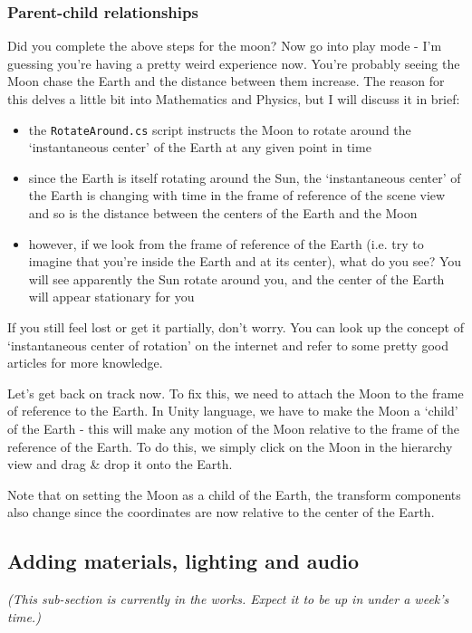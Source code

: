\documentclass{article}[a4paper,12pt]
\theoremstyle{definition}
\begin{document}
\subsubsection{Parent-child relationships}
Did you complete the above steps for the moon? Now go into play mode - I'm guessing you're having a pretty weird experience now. You're probably seeing the Moon chase the Earth and the distance between them increase. The reason for this delves a little bit into Mathematics and Physics, but I will discuss it in brief:
\begin{itemize}
	\item the \texttt{RotateAround.cs} script instructs the Moon to rotate around the `instantaneous center' of the Earth at any given point in time
	\item since the Earth is itself rotating around the Sun, the `instantaneous center' of the Earth is changing with time in the frame of reference of the scene view and so is the distance between the centers of the Earth and the Moon
	\item however, if we look from the frame of reference of the Earth (i.e. try to imagine that you're inside the Earth and at its center), what do you see? You will see apparently the Sun rotate around you, and the center of the Earth will appear stationary for you
\end{itemize}
If you still feel lost or get it partially, don't worry. You can look up the concept of `instantaneous center of rotation' on the internet and refer to some pretty good articles for more knowledge. 
\vspace{6pt}

Let's get back on track now. To fix this, we need to attach the Moon to the frame of reference to the Earth. In Unity language, we have to make the Moon a `child' of the Earth - this will make any motion of the Moon relative to the frame of the reference of the Earth. To do this, we simply click on the Moon in the hierarchy view and drag \& drop it onto the Earth.
\vspace{6pt}

Note that on setting the Moon as a child of the Earth, the transform components also change since the coordinates are now relative to the center of the Earth.
\subsection{Adding materials, lighting and audio}
\textit{(This sub-section is currently in the works. Expect it to be up in under a week's time.)}

\hrulefill
\pagebreak
\end{document}
